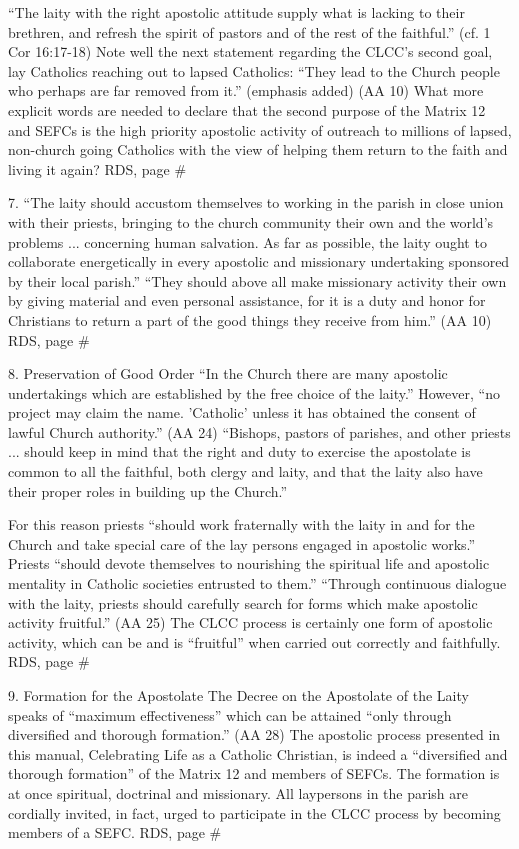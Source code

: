 \documentclass[oneside]{book}
\begin{document}
``The laity with the right apostolic attitude supply what is lacking to their
brethren, and refresh the spirit of pastors and of the rest of the faithful.''
(cf. 1 Cor 16:17-18) Note well the next statement regarding the CLCC's second
goal, lay Catholics reaching out to lapsed Catholics: ``They lead to the Church
people who perhaps are far removed from it.'' (emphasis added) (AA 10) What more
explicit words are needed to declare that the second purpose of the Matrix 12
and SEFCs is the high priority apostolic activity of outreach to millions of
lapsed, non-church going Catholics with the view of helping them return to the
faith and living it again?
RDS, page \#

7. ``The laity should accustom themselves to working in the parish in close
union with their priests, bringing to the church community their own and the
world's problems ... concerning human salvation. As far as possible, the laity
ought to collaborate energetically in every apostolic and missionary undertaking
sponsored by their local parish.'' ``They should above all make missionary
activity their own by giving material and even personal assistance, for it is a
duty and honor for Christians to return a part of the good things they receive
from him.'' (AA 10)
RDS, page \#

8. Preservation of Good Order
``In the Church there are many apostolic undertakings which are established by
the free choice of the laity.'' However, ``no project may claim the
name. 'Catholic' unless it has obtained the consent of lawful Church
authority.'' (AA 24) ``Bishops, pastors of parishes, and other priests
... should keep in mind that the right and duty to exercise the apostolate is
common to all the faithful, both clergy and laity, and that the laity also have
their proper roles in building up the Church.''

For this reason priests ``should work fraternally with the laity in and for the
Church and take special care of the lay persons engaged in apostolic works.''
Priests ``should devote themselves to nourishing the spiritual life and
apostolic mentality in Catholic societies entrusted to them.'' ``Through
continuous dialogue with the laity, priests should carefully search for forms
which make apostolic activity fruitful.'' (AA 25) The CLCC process is certainly
one form of apostolic activity, which can be and is ``fruitful'' when carried
out correctly and faithfully.
RDS, page \#

9. Formation for the Apostolate
The Decree on the Apostolate of the Laity speaks of ``maximum effectiveness''
which can be attained ``only through diversified and thorough formation.'' (AA
28) The apostolic process presented in this manual, Celebrating Life as a
Catholic Christian, is indeed a ``diversified and thorough formation'' of the
Matrix 12 and members of SEFCs. The formation is at once spiritual, doctrinal
and missionary. All laypersons in the parish are cordially invited, in fact,
urged to participate in the CLCC process by becoming members of a SEFC.
RDS, page \#
\end{document}
